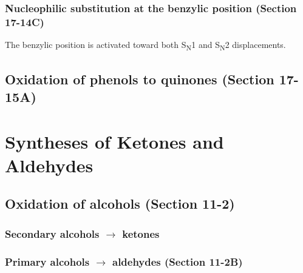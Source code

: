\subsubsection{Nucleophilic substitution at the benzylic position \normalfont(Section 17-14C)}

The benzylic position is activated toward both S\textsubscript N1 and S\textsubscript N2 displacements.


\subsection{Oxidation of phenols to quinones \normalfont(Section 17-15A)}





\section{Syntheses of Ketones and Aldehydes}


\subsection{Oxidation of alcohols \normalfont(Section 11-2)}

\subsubsection{Secondary alcohols $\longrightarrow$ ketones}


\subsubsection{Primary alcohols $\longrightarrow$ aldehydes \normalfont(Section 11-2B)}



